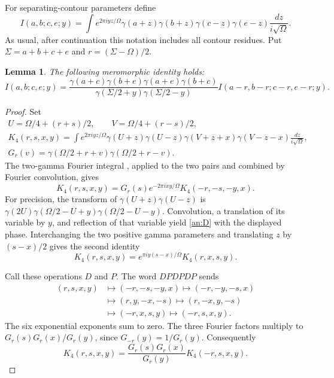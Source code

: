 \documentclass[11pt]{article}
\numberwithin{equation}{section}
\newtheorem{lemma}[theorem]{Lemma}
\theoremstyle{definition}
\theoremstyle{remark}
\begin{document}
For separating-contour parameters define
\[
 I(a,b;c,e;y)=\int e^{2\pi iyz/\Omega}
      \gamma(a+z)\gamma(b+z)\gamma(c-z)\gamma(e-z)
                                               \frac{dz}{i\sqrt\Omega}.
\]
As usual, after continuation this notation includes all contour
residues.  Put $\Sigma=a+b+c+e$ and $r=(\Sigma-\Omega)/2$.
\begin{lemma}\label{an:euler}
The following meromorphic identity holds:
\begin{equation}
 I(a,b;c,e;y)=
 \frac{\gamma(a+c)\gamma(b+e)\gamma(a+e)\gamma(b+c)}
      {\gamma(\Sigma/2+y)\gamma(\Sigma/2-y)}
 I(a-r,b-r;c-r,e-r;y).
 \label{an:euler-general}
\end{equation}
\end{lemma}

\begin{proof}
Set
\begin{gather*}
 U=\Omega/4+(r+s)/2,\qquad V=\Omega/4+(r-s)/2,\\
 K_4(r,s,x,y)=\int e^{2\pi iyz/\Omega}
       \gamma(U+z)\gamma(U-z)
       \gamma(V+z+x)\gamma(V-z-x)\frac{dz}{i\sqrt\Omega},\\
 G_r(v)=\gamma(\Omega/2+r+v)\gamma(\Omega/2+r-v).
\end{gather*}
The two-gamma Fourier integral \cite[Eq.~(2.17)]{BSS}, applied
to the two pairs and combined by Fourier convolution, gives
\begin{equation}
 K_4(r,s,x,y)=G_r(s)e^{-2\pi ixy/\Omega}
                                  K_4(-r,-s,-y,x).
 \label{an:D}
\end{equation}
For precision, the transform of $\gamma(U+z)\gamma(U-z)$ is
$\gamma(2U)\gamma(\Omega/2-U+y)\gamma(\Omega/2-U-y)$.
Convolution, a translation of its variable by $y$, and reflection
of that variable yield \eqref{an:D} with the displayed phase.
Interchanging the two positive gamma parameters and translating
$z$ by $(s-x)/2$ gives the second identity
\begin{equation}
 K_4(r,s,x,y)=e^{\pi iy(s-x)/\Omega}K_4(r,x,s,y).
 \label{an:P}
\end{equation}

Call these operations $D$ and $P$.  The word $DPDPDP$ sends
\begin{align*}
 (r,s,x,y)&\longmapsto(-r,-s,-y,x)
 \longmapsto(-r,-y,-s,x)\\
 &\longmapsto(r,y,-x,-s)
 \longmapsto(r,-x,y,-s)\\
 &\longmapsto(-r,x,s,y)
 \longmapsto(-r,s,x,y).
\end{align*}
The six exponential exponents sum to zero.  The three Fourier
factors multiply to $G_r(s)G_r(x)/G_r(y)$, since
$G_{-r}(y)=1/G_r(y)$.  Consequently
\begin{equation}
 K_4(r,s,x,y)=\frac{G_r(s)G_r(x)}{G_r(y)}K_4(-r,s,x,y).
 \label{an:euler-centered}
\end{equation}


\end{proof}
\end{document}
